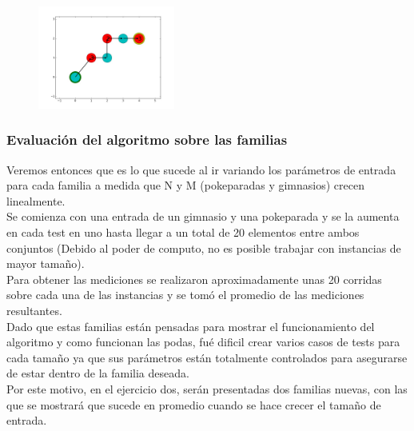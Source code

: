 \begin{figure} [!ht]
{    \includegraphics[width=0.40\textwidth]{./EJ1/fam5.jpeg}}
    \label{fig:f5}
    \label{fig:f6}
    \label{fig:f7}
\end{figure}


\newpage
 
 
  \subsubsection*{Evaluación del algoritmo sobre las familias}

\indent Veremos entonces que es lo que sucede al ir variando los parámetros de entrada para cada familia a medida que N y M (pokeparadas y gimnasios) crecen linealmente.\\

Se comienza con una entrada de un gimnasio y una pokeparada y se la aumenta en cada test en uno hasta llegar a un total de 20 elementos entre ambos conjuntos (Debido al poder de computo, no es posible trabajar con instancias de mayor tamaño).\\

Para obtener las mediciones se realizaron aproximadamente unas 20 corridas sobre cada una de las instancias y se tom\'o el promedio de las mediciones resultantes.\\
Dado que estas familias están pensadas para mostrar el funcionamiento del algoritmo y como funcionan las podas, fué dificil crear varios casos de tests para cada tamaño ya que sus parámetros están totalmente controlados para asegurarse de estar dentro de la familia deseada.\\
Por este motivo, en el ejercicio dos, serán presentadas dos familias nuevas, con las que se mostrará que sucede en promedio cuando se hace crecer el tamaño de entrada.\\

